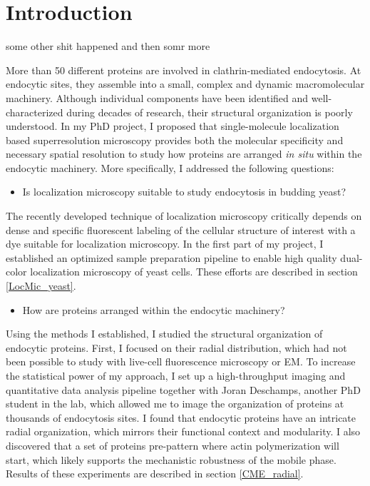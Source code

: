 \chapter{Introduction} %

\label{Ch:Aims} %


some other shit happened
and then somr more

More than 50 different proteins are involved in clathrin-mediated endocytosis. At endocytic sites, they assemble into a small, complex and dynamic macromolecular machinery. Although individual components have been identified and well-characterized during decades of research, their structural organization is poorly understood. In my PhD project, I proposed that single-molecule localization based superresolution microscopy provides both the molecular specificity and necessary spatial resolution to study how proteins are arranged \textit{in situ} within the endocytic machinery. More specifically, I addressed the following questions:

\begin{itemize}
	\item Is localization microscopy suitable to study endocytosis in budding yeast?
\end{itemize}

The recently developed technique of localization microscopy critically depends on dense and specific fluorescent labeling of the cellular structure of interest with a dye suitable for localization microscopy. In the first part of my project, I established an optimized sample preparation pipeline to enable high quality dual-color localization microscopy of yeast cells. These efforts are described in section \ref{LocMic_yeast}.

\begin{itemize}
	\item How are proteins arranged within the endocytic machinery?
\end{itemize}

Using the methods I established, I studied the structural organization of endocytic proteins. First, I focused on their radial distribution, which had not been possible to study with live-cell fluorescence microscopy or EM. To increase the statistical power of my approach, I set up a high-throughput imaging and quantitative data analysis pipeline together with Joran Deschamps, another PhD student in the lab, which allowed me to image the organization of proteins at thousands of endocytosis sites. I found that endocytic proteins have an intricate radial organization, which mirrors their functional context and modularity. I also discovered that a set of proteins pre-pattern where actin polymerization will start, which likely supports the mechanistic robustness of the mobile phase. Results of these experiments are described in section \ref{CME_radial}.

